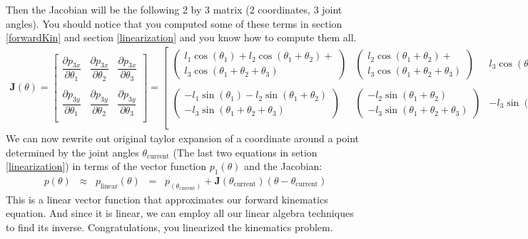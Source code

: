 \documentclass[]{article}
\begin{document}
Then the Jacobian will be the following 2 by 3 matrix (2 coordinates, 3 joint angles). You should notice that you computed some of these terms in section \ref{forwardKin} and section \ref{linearization} and you know how to compute them all.
\begin{eqnarray*} 
    \mathbf{J}(\theta) = 
\begin{bmatrix}
  \dfrac{\partial p_{3x}}{\partial \theta_1} & \dfrac{\partial p_{3x}}{\partial \theta_2} & \dfrac{\partial p_{3x}}{\partial \theta_3} \\\\[-2mm]
  \dfrac{\partial p_{3y}}{\partial \theta_1} & \dfrac{\partial p_{3y}}{\partial \theta_2} & \dfrac{\partial p_{3y}}{\partial \theta_3} \\
\end{bmatrix}
 = 
\begin{bmatrix}
    \left(
    \begin {array}{c}
    l_1\cos(\theta_1) + l_2\cos(\theta_1 + \theta_2) +  \\
    l_3\cos(\theta_1 + \theta_2 + \theta_3)
    \end{array}
    \right) &    
    \left(
    \begin {array}{c}
    l_2\cos(\theta_1 + \theta_2) + \\
    l_3\cos(\theta_1 + \theta_2 + \theta_3) 
    \end{array}
    \right)    
    & l_3\cos(\theta_1 + \theta_2 + \theta_3) \\\\[-2mm]
  
    \left(
    \begin {array}{c}
    -l_1\sin(\theta_1) - l_2\sin(\theta_1 + \theta_2)  \\
    - l_3\sin(\theta_1 + \theta_2 + \theta_3)
    \end{array}
    \right) &    
    \left(
    \begin {array}{c}
    -l_2\sin(\theta_1 + \theta_2)\\
    - l_3\sin(\theta_1 + \theta_2 + \theta_3) 
    \end{array}
    \right)    
    & -l_3\sin(\theta_1 + \theta_2 + \theta_3) \\\\[-2mm]
\end{bmatrix}
\end{eqnarray*}
We can now rewrite out original taylor expansion of a coordinate around a point determined by the joint angles $\theta_{\text{current}}$ (The last two equations in setion \ref{linearization}) in terms of the vector function $p_1(\theta)$ and the Jacobian:
\begin{eqnarray}\label{JacobiLinearization}
    p(\theta) \;\; \approx \;\; p_{\text{linear}}(\theta) \;\; = \;\; p_(\theta_{\text{current}}) + \mathbf{J}(\theta_{\text{current}})(\theta - \theta_{\text{current}})
\end{eqnarray}
This is a linear vector function that approximates our forward kinematics equation. And since it is linear, we can employ all our linear algebra techniques to find its inverse. Congratulations, you linearized the kinematics problem.
\pagebreak
\end{document}
